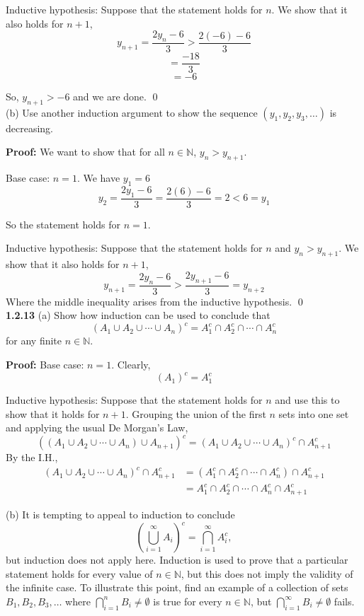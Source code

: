 \documentclass{article}
\begin{document}
Inductive hypothesis: Suppose that the statement holds for $n$. We show that it also holds for $n+1$,
$$y_{n+1} = \frac{2y_n - 6}{3} > \frac{2(-6) - 6}{3}$$
$$  = \frac{-18}{3} $$
$$  = -6$$

So, $y_{n+1} > -6$ and we are done. \qed \\


(b) Use another induction argument to show the sequence $(y_1, y_2, y_3, \ldots)$ is decreasing.

\textbf{Proof:} We want to show that for all $n \in \mathbb{N}$,  $y_n > y_{n+1}$. 

Base case: $n=1$. We have $y_1 = 6$
$$ y_2 = \frac{2y_1 - 6}{3} = \frac{2(6) - 6}{3} = 2 < 6 = y_1$$

So the statement holds for $n=1$.

Inductive hypothesis: Suppose that the statement holds for $n$ and $y_n > y_{n+1}$. We show that it also holds for $n+1$,
$$y_{n+1} = \frac{2y_n - 6}{3} > \frac{2y_{n+1} - 6}{3} = y_{n+2}$$
Where the middle inequality arises from the inductive hypothesis. \qed \\



\noindent \textbf{1.2.13}
(a) Show how induction can be used to conclude that
$$ (A_1 \cup A_2 \cup \cdots \cup A_n)^c = A^c_1 \cap A^c_2 \cap \cdots \cap A^c_n $$
for any finite $n \in \mathbb{N}$.

\textbf{Proof:} Base case: $n=1$. Clearly,
$$ (A_1)^c = A_1^c$$

Inductive hypothesis: Suppose that the statement holds for $n$ and use this to show that it holds for $n+1$. Grouping the union of the first $n$ sets into one set and applying the usual De Morgan's Law,
$$ ((A_1 \cup A_2 \cup \cdots \cup A_n) \cup A_{n+1})^c = (A_1 \cup A_2 \cup \cdots \cup A_n)^c \cap A_{n+1}^c$$
By the I.H.,
\begin{align*}
(A_1 \cup A_2 \cup \cdots \cup A_n)^c \cap A_{n+1}^c &= (A^c_1 \cap A^c_2 \cap \cdots \cap A^c_n) \cap A_{n+1}^c \\
&= A^c_1 \cap A^c_2 \cap \cdots \cap A_n^c \cap A^c_{n+1}
\end{align*}

(b) It is tempting to appeal to induction to conclude
$$ ( \bigcup_{i=1}^{\infty} A_i )^c = \bigcap_{i=1}^{\infty} A_i^c, $$
but induction does not apply here. Induction is used to prove that a
particular statement holds for every value of $n \in \mathbb{N}$, but this does not
imply the validity of the infinite case. To illustrate this point, find an
example of a collection of sets $B_1, B_2, B_3, \ldots$ where $\bigcap_{i=1}^{n} B_i \neq \emptyset$ is true
for every $n \in \mathbb{N}$, but $\bigcap_{i=1}^{\infty} B_i \neq \emptyset$ fails.
\end{document}

